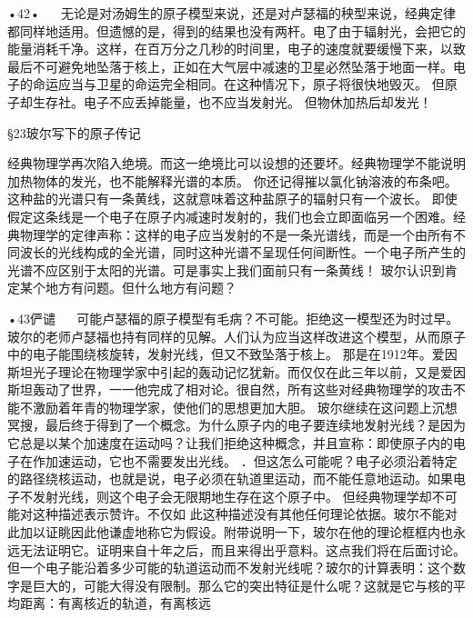 •42•
  
无论是对汤姆生的原子模型来说，还是对卢瑟福的秧型来说，经典定律都同样地适用。但遗憾的是，得到的结果也没有两杆。电了由于辐射光，会把它的能量消耗千净。这样，在百万分之几秒的时间里，电子的速度就要缓慢下来，以致最后不可避免地坠落于核上，正如在大气层中减速的卫星必然坠落于地面一样。电子的命运应当与卫星的命运完全相同。在这种情况下，原子将很快地毁灭。
但原子却生存社。电子不应丢掉能量，也不应当发射光。
但物休加热后却发光！

§23玻尔写下的原子传记

经典物理学再次陷入绝境。而这一绝境比可以设想的还要坏。经典物理学不能说明加热物体的发光，也不能解释光谱的本质。
你还记得摧以氯化钠溶液的布条吧。这种盐的光谱只有一条黄线，这就意味着这种盐原子的辐射只有一个波长。
即使假定这条线是一个电子在原子内减速时发射的，我们也会立即面临另一个困难。经典物理学的定律声称：这样的电子应当发射的不是一条光谱线，而是一个由所有不同波长的光线构成的全光谱，同时这种光谱不呈现任何间断性。一个电子所产生的光谱不应区别于太阳的光谱。可是事实上我们面前只有一条黄线！
玻尔认识到肯定某个地方有问题。但什么地方有问题？

•43俨谴
  
可能卢瑟福的原子模型有毛病？不可能。拒绝这一模型还为时过早。玻尔的老师卢瑟福也持有同样的见解。人们认为应当这样改进这个模型，从而原子中的电子能围绕核旋转，发射光线，但又不致坠落于核上。
那是在1912年。爱因斯坦光子理论在物理学家中引起的轰动记忆犹新。而仅仅在此三年以前，又是爱因斯坦轰动了世界，一一他完成了相对论。很自然，所有这些对经典物理学的攻击不能不激励着年青的物理学家，使他们的思想更加大胆。
玻尔继续在这问题上沉想冥搜，最后终于得到了一个概念。为什么原子内的电子要连续地发射光线？是因为它总是以某个加速度在运动吗？让我们拒绝这种概念，并且宣称：即使原子内的电子在作加速运动，它也不需要发出光线。
．但这怎么可能呢？电子必须沿着特定的路径绕核运动，也就是说，电子必须在轨道里运动，而不能任意地运动。如果电子不发射光线，则这个电子会无限期地生存在这个原子中。
但经典物理学却不可能对这种描述表示赞许。不仅如
此这种描述没有其他任何理论依据。玻尔不能对此加以证眺因此他谦虚地称它为假设。附带说明一下，玻尔在他的理论框框内也永远无法证明它。证明来自十年之后，而且来得出乎意料。这点我们将在后面讨论。但一个电子能沿着多少可能的轨道运动而不发射光线呢？玻尔的计算表明：这个数字是巨大的，可能大得没有限制。那么它的突出特征是什么呢？这就是它与核的平均距离：有离核近的轨道，有离核远

